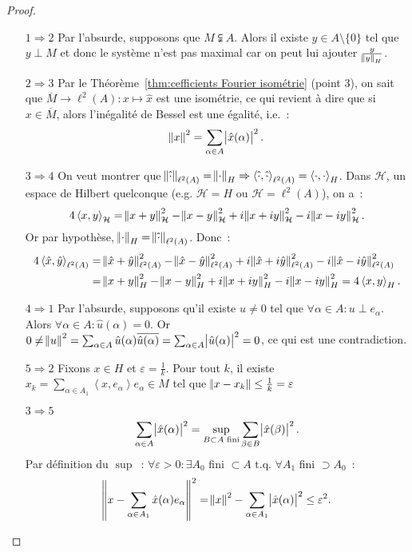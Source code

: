 \documentclass{report}
\newcommand{\scpr}[2]{\left\langle#1, #2\right\rangle}
\newcommand{\tq}{\text{ t.q. }}
\theoremstyle{definition}
\theoremstyle{remark}
\begin{document}
\begin{proof}~
\begin{itemize}
	\item[$1 \Rightarrow 2$] Par l'absurde, supposons que $M \subsetneqq A$. Alors il existe $y \in A \setminus \{0\}$ tel que $y \perp M$ et donc le système n'est pas maximal
	car on peut lui ajouter $\frac y{\norm y_H}$.
	\item[$2 \Rightarrow 3$] Par le Théorème~\ref{thm:cefficients Fourier isométrie} (point 3), on sait que $\overline M \to \ell^2(A) : x \mapsto \hat x$ est une isométrie,
	ce qui revient à dire que si $x \in \overline M$, alors l'inégalité de Bessel est une égalité, i.e.~:
	\[\norm x^2 = \sum_{\alpha \in A}\abs {\hat x(\alpha)}^2.\]
	\item[$3 \Rightarrow 4$] On veut montrer que $\norm {\hat \cdot}_{\ell^2(A)} = \norm \cdot_H \Rightarrow \scpr {\hat \cdot}{\hat \cdot}_{\ell^2(A)} = \scpr \cdot\cdot_H$.
	Dans $\mathcal H$, un espace de Hilbert quelconque (e.g. $\mathcal H = H$ ou $\mathcal H = \ell^2(A)$), on a~:
	\[4\scpr xy_{\mathcal H} = \norm {x+y}^2_{\mathcal H} - \norm {x-y}^2_{\mathcal H} + i\norm {x+iy}^2_{\mathcal H} - i\norm {x-iy}^2_{\mathcal H}.\]
	Or par hypothèse, $\norm \cdot_H = \norm {\hat \cdot}_{\ell^2(A)}$. Donc~:
	\begin{align*}
		4 \scpr {\hat x}{\hat y}_{\ell^2(A)} &= \norm {\hat x+\hat y}^2_{\ell^2(A)} - \norm {\hat x-\hat y}^2_{\ell^2(A)} + i\norm {\hat x+i\hat y}^2_{\ell^2(A)} - i\norm {\hat x-i\hat y}^2_{\ell^2(A)} \\
		&= \norm {x+y}^2_H - \norm {x-y}^2_H + i\norm {x+iy}^2_H - i\norm {x-iy}^2_H = 4\scpr xy_H.
	\end{align*}
	\item[$4 \Rightarrow 1$] Par l'absurde, supposons qu'il existe $u \neq 0$ tel que $\forall \alpha \in A : u \perp e_\alpha$. Alors $\forall \alpha \in A : \hat u(\alpha) = 0$.
	Or $0 \neq \norm u^2 = \sum_{\alpha \in A}\hat u(\alpha)\overline {\hat u(\alpha)} = \sum_{\alpha \in A}\abs {\hat u(\alpha)}^2 = 0$, ce qui est une contradiction.
	\item[$5 \Rightarrow 2$] Fixons $x \in H$ et $\varepsilon = \frac 1k$. Pour tout $k$, il existe $x_k = \sum_{\alpha \in A_1}\scpr x{e_\alpha}e_\alpha \in M$ tel que
	$\norm {x-x_k} \leq \frac 1k = \varepsilon$
	\item[$3 \Rightarrow 5$]
	\[\sum_{\alpha \in A}\abs {\hat x(\alpha)}^2 = \sup_{B \subset A \text{ fini}}\sum_{\beta \in B}\abs {\hat x(\beta)}^2.\]
	Par définition du $\sup$~: $\forall \varepsilon > 0 : \exists A_0$ fini $\subset A \tq \forall A_1$ fini $\supset A_0$~:
	\[\norm {x- \sum_{\alpha \in A_1}\hat x(\alpha)e_\alpha}^2 = \norm x^2 - \sum_{\alpha \in A_1}\abs {\hat x(\alpha)}^2 \leq \varepsilon^2.\]
\end{itemize}
\end{proof}
\end{document}
